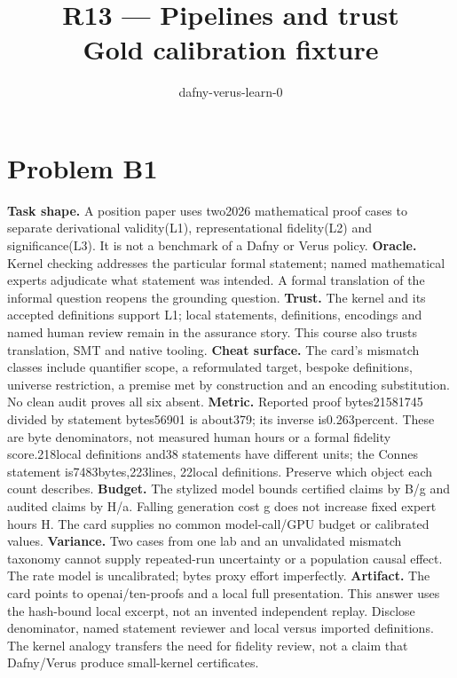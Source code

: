 \documentclass[11pt]{article}
\title{R13 --- Pipelines and trust \\ \large Gold calibration fixture}
\author{dafny-verus-learn-0}
\date{}
\begin{document}
\maketitle
\sloppy
\section*{Problem B1}\label{ans:B1}
\begin{answer}
\textbf{Task shape.} A position paper uses two2026 mathematical proof cases to
separate derivational validity(L1), representational fidelity(L2) and
significance(L3). It is not a benchmark of a Dafny or Verus policy.
\textbf{Oracle.} Kernel checking addresses the particular formal statement;
named mathematical experts adjudicate what statement was intended. A formal
translation of the informal question reopens the grounding question.
\textbf{Trust.} The kernel and its accepted definitions support L1; local
statements, definitions, encodings and named human review remain in the
assurance story. This course also trusts translation, SMT and native tooling.
\textbf{Cheat surface.} The card's mismatch classes include quantifier scope,
a reformulated target, bespoke definitions, universe restriction, a premise
met by construction and an encoding substitution. No clean audit proves all
six absent.
\textbf{Metric.} Reported proof bytes21581745 divided by statement bytes56901
is about379; its inverse is0.263percent. These are byte denominators, not
measured human hours or a formal fidelity score.218local definitions and38
statements have different units; the Connes statement is7483bytes,223lines,
22local definitions. Preserve which object each count describes.
\textbf{Budget.} The stylized model bounds certified claims by B/g and audited
claims by H/a. Falling generation cost g does not increase fixed expert hours
H. The card supplies no common model-call/GPU budget or calibrated values.
\textbf{Variance.} Two cases from one lab and an unvalidated mismatch taxonomy
cannot supply repeated-run uncertainty or a population causal effect. The
rate model is uncalibrated; bytes proxy effort imperfectly.
\textbf{Artifact.} The card points to openai/ten-proofs and a local full
presentation. This answer uses the hash-bound local excerpt, not an invented
independent replay. Disclose denominator, named statement reviewer and local
versus imported definitions. The kernel analogy transfers the need for
fidelity review, not a claim that Dafny/Verus produce small-kernel certificates.
\end{answer}
\end{document}
